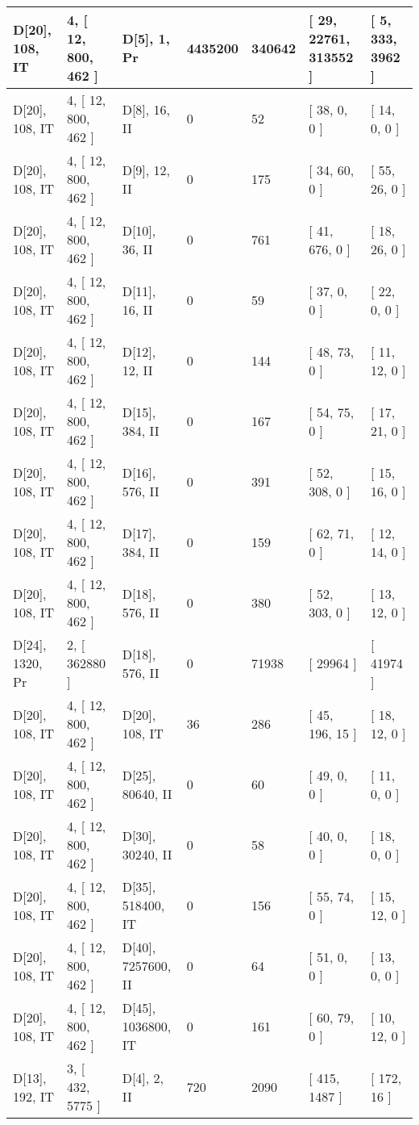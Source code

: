 \documentclass[9 pt]{scrartcl}
\begin{document}
\begin{longtable}{ |p{3em}|p{6em}|p{3em}|p{2em}|p{2em}|p{6em}|p{6em}| }
D[20], 108, IT &4, [ 12, 800, 462 ] & D[5], 1, Pr  & 4435200 & 340642 & [ 29, 22761, 313552 ] & [ 5, 333, 3962 ]\\ \hline
D[20], 108, IT &4, [ 12, 800, 462 ] & D[8], 16, II  & 0 & 52 & [ 38, 0, 0 ] & [ 14, 0, 0 ]\\ \hline
D[20], 108, IT &4, [ 12, 800, 462 ] & D[9], 12, II  & 0 & 175 & [ 34, 60, 0 ] & [ 55, 26, 0 ]\\ \hline
D[20], 108, IT &4, [ 12, 800, 462 ] & D[10], 36, II  & 0 & 761 & [ 41, 676, 0 ] & [ 18, 26, 0 ]\\ \hline
D[20], 108, IT &4, [ 12, 800, 462 ] & D[11], 16, II  & 0 & 59 & [ 37, 0, 0 ] & [ 22, 0, 0 ]\\ \hline
D[20], 108, IT &4, [ 12, 800, 462 ] & D[12], 12, II  & 0 & 144 & [ 48, 73, 0 ] & [ 11, 12, 0 ]\\ \hline
D[20], 108, IT &4, [ 12, 800, 462 ] & D[15], 384, II  & 0 & 167 & [ 54, 75, 0 ] & [ 17, 21, 0 ]\\ \hline
D[20], 108, IT &4, [ 12, 800, 462 ] & D[16], 576, II  & 0 & 391 & [ 52, 308, 0 ] & [ 15, 16, 0 ]\\ \hline
D[20], 108, IT &4, [ 12, 800, 462 ] & D[17], 384, II  & 0 & 159 & [ 62, 71, 0 ] & [ 12, 14, 0 ]\\ \hline
D[20], 108, IT &4, [ 12, 800, 462 ] & D[18], 576, II  & 0 & 380 & [ 52, 303, 0 ] & [ 13, 12, 0 ]\\ \hline
D[24], 1320, Pr &2, [ 362880 ] & D[18], 576, II  & 0 & 71938 & [ 29964 ] & [ 41974 ]\\ \hline
D[20], 108, IT &4, [ 12, 800, 462 ] & D[20], 108, IT  & 36 & 286 & [ 45, 196, 15 ] & [ 18, 12, 0 ]\\ \hline
D[20], 108, IT &4, [ 12, 800, 462 ] & D[25], 80640, II  & 0 & 60 & [ 49, 0, 0 ] & [ 11, 0, 0 ]\\ \hline
D[20], 108, IT &4, [ 12, 800, 462 ] & D[30], 30240, II  & 0 & 58 & [ 40, 0, 0 ] & [ 18, 0, 0 ]\\ \hline
D[20], 108, IT &4, [ 12, 800, 462 ] & D[35], 518400, IT  & 0 & 156 & [ 55, 74, 0 ] & [ 15, 12, 0 ]\\ \hline
D[20], 108, IT &4, [ 12, 800, 462 ] & D[40], 7257600, II  & 0 & 64 & [ 51, 0, 0 ] & [ 13, 0, 0 ]\\ \hline
D[20], 108, IT &4, [ 12, 800, 462 ] & D[45], 1036800, IT  & 0 & 161 & [ 60, 79, 0 ] & [ 10, 12, 0 ]\\ \hline
D[13], 192, IT &3, [ 432, 5775 ] & D[4], 2, II  & 720 & 2090 & [ 415, 1487 ] & [ 172, 16 ]\\ \hline

\end{longtable}
\end{document}
